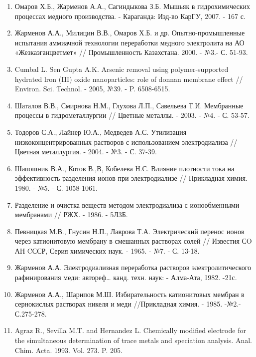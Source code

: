 \begin{enumerate}
\item
Омаров Х.Б., Жарменов А.А., Сагиндыкова З.Б. Мышьяк в гидрохимических
процессах медного производства. - Караганда: Изд-во КарГУ, 2007. - 167
с.

\item
Жарменов А.А., Милицин В.В., Омаров Х.Б. и др. Опытно-промышленные
испытания аммиачной технологии переработки медного электролита на АО
«Жезказганцветмет» // Промышленность Казахстана. 2000. - №3.- С. 51-93.

\item
Cumbal L. Sen Gupta A.K. Arsenic removal using polymer-supported
hydrated lron (III) oxide nanoparticles: role of donnan membrane effect
// Environ. Sci. Technol. - 2005, №39. - P. 6508-6515.

\item
Шаталов В.В., Смирнова Н.М., Глухова Л.П., Савельева Т.И. Мембранные
процессы в гидрометаллургии // Цветные металлы. - 2003. - №4. - С.
53-57.

\item
Тодоров С.А., Лайнер Ю.А., Медведев А.С. Утилизация
низкоконцентрированных растворов с использованием электродиализа //
Цветная металлургия. - 2004. - №3. - С. 37-39.

\item
Шапошник В.А., Котов В.,В, Кобелева Н.С. Влияние плотности тока на
эффективность разделения ионов при электродиализе // Прикладная химия.
- 1980. - №5. - С. 1058-1061.

\item
Разделение и очистка веществ методом электродиализа с ионообменными
мембранами // РЖХ. - 1986. - 5Л3Б.

\item
Певницкая М.В., Гнусин Н.П., Лаврова Т.А. Электрический перенос ионов
через катионитовую мембрану в смешанных растворах солей // Известия СO
АН CССР, Серия химических наук. - 1965. - №7. - С. 13-18.

\item
Жарменов А.А. Электродиализная переработка растворов
электролитического рафинирования меди: автореф\ldots{} канд. техн. наук:
- Алма-Ата, 1982. -21с.

\item
Жарменов А.А., Шарипов М.Ш. Избирательность катионитовых мембран в
сернокислых растворах никеля и меди //Прикладная химия. - 1985.
-№2.-С.275-278.

\item
Agraz R., Sevilla M.T. and Hernandez L. Chemically modified
electrode for the simultaneous determination of trace metals and
speciation analysis. Anal. Chim. Acta. 1993. Vol. 273. P. 205.


\end{enumerate}
